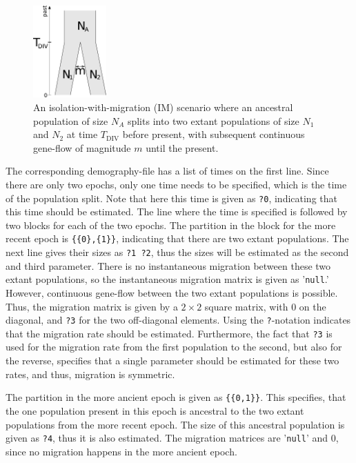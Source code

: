 \documentclass{article}
\numberwithin{equation}{section}
\begin{document}
\begin{figure}
  \begin{center}
    \includegraphics[width=0.25\textwidth]{graphics/isolationMigration.pdf}
  \end{center} 
  \caption{An isolation-with-migration (IM) scenario where an ancestral population of size $N_A$ splits into two extant populations of size $N_1$ and $N_2$ at time $T_\text{DIV}$ before present, with subsequent continuous gene-flow of magnitude $m$ until the present.}
  \label{fig_isolation_migration}
\end{figure}

The corresponding demography-file has a list of times on the first line. Since there are only two epochs, only one time needs to be specified, which is the time of the population split. Note that here this time is given as \texttt{?0}, indicating that this time should be estimated. The line where the time is specified is followed by two blocks for each of the two epochs. The partition in the block for the more recent epoch is \texttt{\{\{0\},\{1\}\}}, indicating that there are two extant populations. The next line gives their sizes as \texttt{?1 ?2}, thus the sizes will be estimated as the second and third parameter. There is no instantaneous migration between these two extant populations, so the instantaneous migration matrix is given as '\texttt{null}.' However, continuous gene-flow between the two extant populations is possible. Thus, the migration matrix is given by a $2 \times 2$ square matrix, with 0 on the diagonal, and \texttt{?3} for the two off-diagonal elements. Using the \texttt{?}-notation indicates that the migration rate should be estimated. Furthermore, the fact that \texttt{?3} is used for the migration rate from the first population to the second, but also for the reverse, specifies that a single parameter should be estimated for these two rates, and thus, migration is symmetric.

The partition in the more ancient epoch is given as \texttt{\{\{0,1\}\}}. This specifies, that the one population present in this epoch is ancestral to the two extant populations from the more recent epoch. The size of this ancestral population is given as \texttt{?4}, thus it is also estimated. The migration matrices are '\texttt{null}' and 0, since no migration happens in the more ancient epoch.
\end{document}
